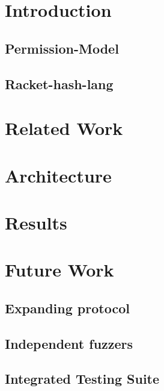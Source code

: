 \section{Introduction}\label{section:Introduction}


\subsection{Permission-Model}\label{section:Permssion-model}

\subsection{Racket-hash-lang}\label{section:racket}

\section{Related Work}\label{section:relatedwork}

\section{Architecture}\label{section:arch}


\section{Results}


\section{Future Work}
\subsection{Expanding protocol}
\subsection{Independent fuzzers}
\subsection{Integrated Testing Suite}


